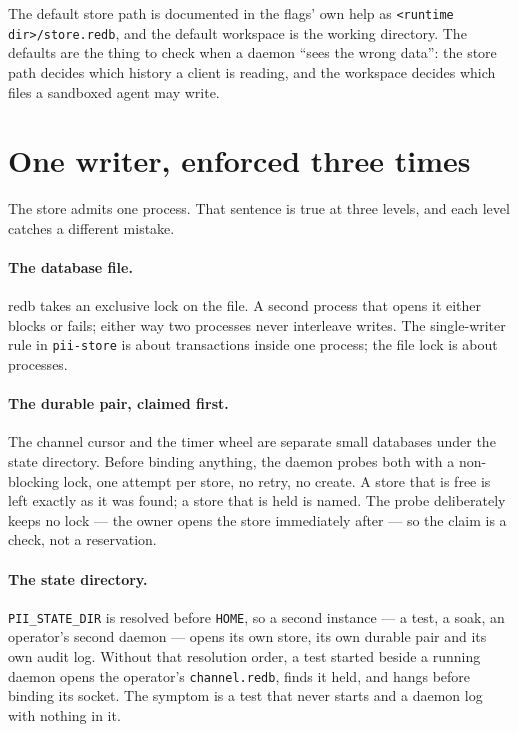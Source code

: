 The default store path is documented in the flags' own help as \texttt{<runtime
dir>/store.redb}, and the default workspace is the working directory. The defaults are the
thing to check when a daemon ``sees the wrong data'': the store path decides which history a
client is reading, and the workspace decides which files a sandboxed agent may write.

\section{One writer, enforced three times}

The store admits one process. That sentence is true at three levels, and each level catches a
different mistake.

\paragraph{The database file.} redb takes an exclusive lock on the file. A second process that
opens it either blocks or fails; either way two processes never interleave writes. The
single-writer rule in \texttt{pii-store} is about transactions inside one process; the file
lock is about processes.

\paragraph{The durable pair, claimed first.} The channel cursor and the timer wheel are
separate small databases under the state directory. Before binding anything, the daemon probes
both with a non-blocking lock, one attempt per store, no retry, no create. A store that is
free is left exactly as it was found; a store that is held is named. The probe deliberately
keeps no lock --- the owner opens the store immediately after --- so the claim is a check, not
a reservation.

\paragraph{The state directory.} \texttt{PII\_STATE\_DIR} is resolved before \texttt{HOME}, so
a second instance --- a test, a soak, an operator's second daemon --- opens its own store, its
own durable pair and its own audit log. Without that resolution order, a test started beside a
running daemon opens the operator's \texttt{channel.redb}, finds it held, and hangs before
binding its socket. The symptom is a test that never starts and a daemon log with nothing in
it.

